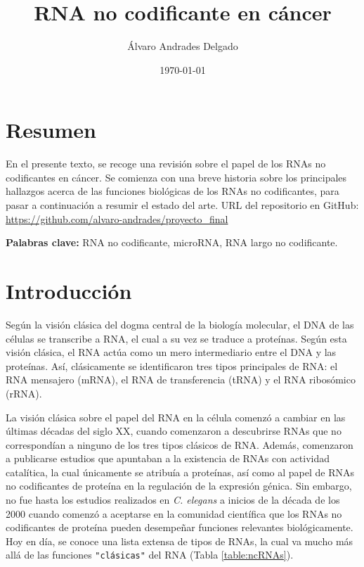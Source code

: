 \documentclass[a4paper,11pt]{article}
\begin{document}
\title{RNA no codificante en cáncer}
\author{Álvaro Andrades Delgado}
\date{\today}
\maketitle

\section{Resumen}

En el presente texto, se recoge una revisión sobre el papel de los RNAs no codificantes en cáncer. Se comienza con una breve historia sobre los principales hallazgos acerca de las funciones biológicas de los RNAs no codificantes, para pasar a continuación a resumir el estado del arte. URL del repositorio en GitHub: \url{https://github.com/alvaro-andrades/proyecto_final} 

\textbf{Palabras clave:} RNA no codificante, microRNA, RNA largo no codificante.


\section{Introducción}

Según la visión clásica del dogma central de la biología molecular, el DNA de las células se transcribe a RNA, el cual a su vez se traduce a proteínas\cite{Kung2013}. Según esta visión clásica, el RNA actúa como un mero intermediario entre el DNA y las proteínas. Así, clásicamente se identificaron tres tipos principales de RNA: el RNA mensajero (mRNA), el RNA de transferencia (tRNA) y el RNA ribosómico (rRNA)\cite{Cech2014}.

La visión clásica sobre el papel del RNA en la célula comenzó a cambiar en las últimas décadas del siglo XX, cuando comenzaron a descubrirse RNAs que no correspondían a ninguno de los tres tipos clásicos de RNA\cite{Cech2014}. Además, comenzaron a publicarse estudios que apuntaban a la existencia de RNAs con actividad catalítica, la cual únicamente se atribuía a proteínas\cite{Kruger1982}, así como al papel de RNAs no codificantes de proteína en la regulación de la expresión génica\cite{Brannan1990}. Sin embargo, no fue hasta los estudios realizados en \textit{C. elegans} a inicios de la década de los 2000 cuando comenzó a aceptarse en la comunidad científica que los RNAs no codificantes de proteína pueden desempeñar funciones relevantes biológicamente\cite{Grishok2001}. Hoy en día, se conoce una lista extensa de tipos de RNAs, la cual va mucho más allá de las funciones \verb="clásicas"= del RNA (Tabla \ref{table:ncRNAs}).
\end{document}
